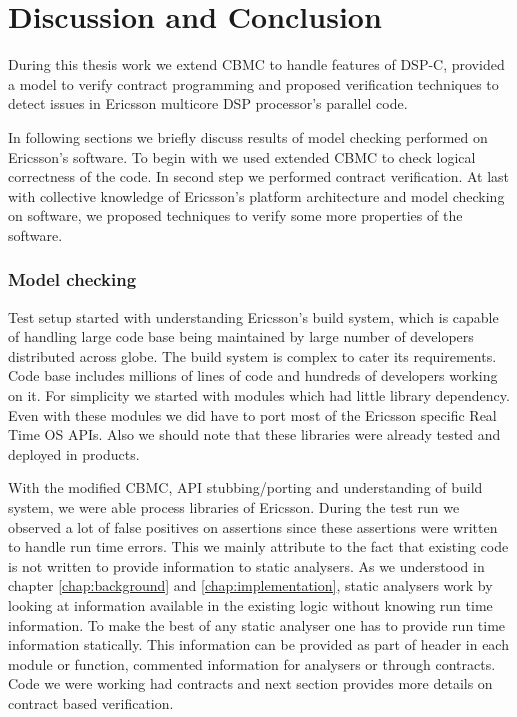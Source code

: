 
\chapter{Discussion and Conclusion} \label{chapter:discussion}


During this thesis work we extend CBMC to handle features of DSP-C, provided a model to verify contract programming and proposed verification techniques to detect issues in Ericsson multicore DSP processor's parallel code.

In following sections we briefly discuss results of model checking performed on Ericsson's software. To begin with we used extended CBMC to check logical correctness of the code. In second step we performed contract verification. At last with collective knowledge of Ericsson's platform architecture and model checking on software, we proposed techniques to verify some more properties of the software.

\subsection{Model checking}
Test setup started with understanding Ericsson's build system, which is capable of handling large code base being maintained by large number of developers distributed across globe. The build system is complex to cater its requirements. Code base includes millions of lines of code and hundreds of developers working on it. For simplicity we started with modules which had little library dependency. Even with these modules we did have to port most of the Ericsson specific Real Time OS APIs. Also we should note that these libraries were already tested and deployed in products.

With the modified CBMC, API stubbing/porting and understanding of build system, we were able process libraries of Ericsson. During the test run we observed a lot of false positives on assertions since these assertions were written to handle run time errors. This we mainly attribute to the fact that existing code is not written to provide information to static analysers. As we understood in chapter \autoref{chap:background} and \autoref{chap:implementation}, static analysers work by looking at information available in the existing logic without knowing run time information. To make the best of any static analyser one has to provide run time information statically. This information can be provided as part of header in each module or function, commented information for analysers or through contracts. Code we were working had contracts and next section provides more details on contract based verification.

